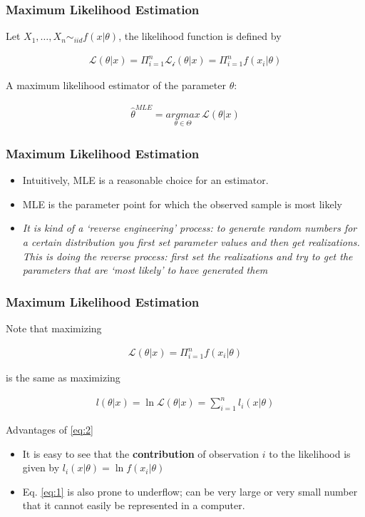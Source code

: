 \documentclass[
  shownotes,
  xcolor={svgnames},
  hyperref={colorlinks,citecolor=DarkBlue,linkcolor=DarkRed,urlcolor=DarkBlue}
  , aspectratio=169]{beamer}
\begin{document}
\begin{frame}[fragile]
\frametitle{Maximum Likelihood Estimation}

Let $X_1,\dots,X_n\sim_{iid}f(x|\theta)$, the likelihood function is defined by

\begin{align}\label{eq:1}
\mathcal{L}(\theta|x)=\Pi_{i=1}^n \mathcal{L_{i}}(\theta|x)=\Pi_{i=1}^n f(x_i|\theta)
\end{align}

A maximum likelihood estimator of the parameter $\theta$:

\begin{align}
\hat \theta^{MLE}=\underset{\theta \in \Theta}{argmax}\, \mathcal{L}(\theta|x)
\end{align}


\end{frame}

\begin{frame}[fragile]
\frametitle{Maximum Likelihood Estimation}

\begin{itemize}
  \item Intuitively, MLE is a reasonable choice for an estimator.
  \medskip
  \item MLE is the parameter point for which the observed sample is most likely
  \medskip
  \item {\it It is kind of a ‘reverse engineering’ process:  to generate random numbers for a certain distribution you first set parameter values and then get realizations. This is doing the reverse process:  first set the realizations and try to get the parameters that are ‘most likely’ to have generated them}
\end{itemize}


 \end{frame}

\begin{frame}[fragile]
\frametitle{Maximum Likelihood Estimation}
Note that maximizing 

\begin{align}\label{eq:1}
\mathcal{L}(\theta|x)=\Pi_{i=1}^n f(x_i|\theta)
\end{align}

is the same as maximizing

\begin{align}\label{eq:2}
l(\theta|x)=\ln \mathcal{L}(\theta|x)=\sum_{i=1}^n l_i(x|\theta)
\end{align}

\bigskip
Advantages of \eqref{eq:2}
\begin{itemize}
\item It is easy to see that the {\bf contribution} of observation $i$ to the likelihood is given by $l_i(x|\theta)=\ln f(x_i|\theta)$
\item Eq. \eqref{eq:1} is also prone to underflow; can be very large or very small number that it cannot easily be represented in a computer. 
\end{itemize}

\end{frame}
\end{document}
